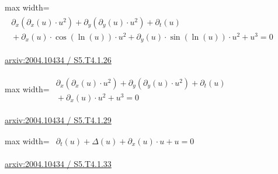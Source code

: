 \documentclass[UTF8,10pt,a4paper,fontset=mac]{ctexart}
\begin{document}
\begin{minipage}{\linewidth}\begin{center}\begin{adjustbox}{max width=\linewidth}$\displaystyle\begin{gathered}\begin{gathered}\partial_{x}(\partial_{x}(u)\cdot u^{2})+\partial_{y}(\partial_{y}(u)\cdot u^{2})+\partial_{t}(u)\\[-1pt]{}+\partial_{x}(u)\cdot \cos(\ln(u))\cdot u^{2}+\partial_{y}(u)\cdot \sin(\ln(u))\cdot u^{2}+u^{3}=0\end{gathered}\end{gathered}$\end{adjustbox}\end{center}{\small\href{https://arxiv.org/html/2004.10434#S5.T4.1.26}{arxiv:2004.10434 / S5.T4.1.26}}\par\end{minipage}\par\vspace{6mm}

\begin{minipage}{\linewidth}\begin{center}\begin{adjustbox}{max width=\linewidth}$\displaystyle\begin{gathered}\begin{gathered}\partial_{x}(\partial_{x}(u)\cdot u^{2})+\partial_{y}(\partial_{y}(u)\cdot u^{2})+\partial_{t}(u)\\[-1pt]{}+\partial_{x}(u)\cdot u^{2}+u^{3}=0\end{gathered}\end{gathered}$\end{adjustbox}\end{center}{\small\href{https://arxiv.org/html/2004.10434#S5.T4.1.29}{arxiv:2004.10434 / S5.T4.1.29}}\par\end{minipage}\par\vspace{6mm}

\begin{minipage}{\linewidth}\begin{center}\begin{adjustbox}{max width=\linewidth}$\displaystyle\begin{gathered}\begin{gathered}\partial_{t}(u)+\Delta(u)+\partial_{x}(u)\cdot u+u=0\end{gathered}\end{gathered}$\end{adjustbox}\end{center}{\small\href{https://arxiv.org/html/2004.10434#S5.T4.1.33}{arxiv:2004.10434 / S5.T4.1.33}}\par\end{minipage}\par\vspace{6mm}
\end{document}
